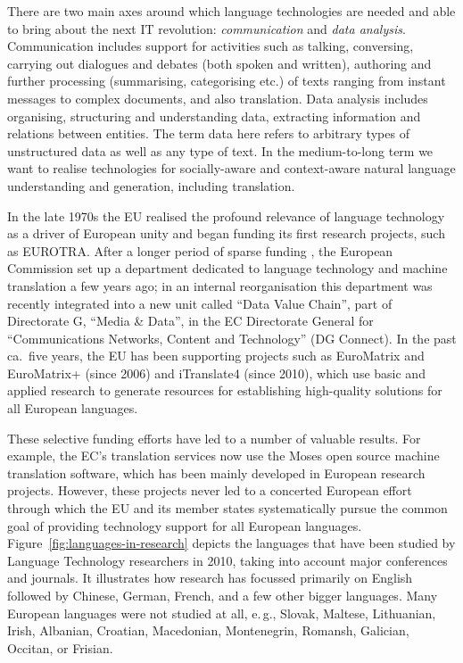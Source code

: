\documentclass[10pt, plain]{../../metanetpaper}
\begin{document}
\begin{multicols}{2}
There are two main axes around which language technologies are needed and able to bring about the next IT revolution: \emph{communication} and \emph{data analysis}. Communication includes support for activities such as talking, conversing, carrying out dialogues and debates (both spoken and written), authoring and further processing (summarising, categorising etc.) of texts ranging from instant messages to complex documents, and also translation. Data analysis includes organising, structuring and understanding data, extracting information and relations between entities. The term data here refers to arbitrary types of unstructured data as well as any type of text. In the medium-to-long term we want to realise technologies for socially-aware and context-aware natural language understanding and generation, including translation.

In the late 1970s the EU realised the profound relevance of language technology as a driver of European unity and began funding its first research projects, such as EUROTRA. After a longer period of sparse funding \cite{laz1,euromap}, the European Commission set up a department dedicated to language technology and machine translation a few years ago; in an internal reorganisation this department was recently integrated into a new unit called ``Data Value Chain'', part of Directorate G, ``Media \& Data'', in the EC Directorate General for ``Communications Networks, Content and Technology'' (DG Connect). In the past ca.~five years, the EU has been supporting projects such as EuroMatrix and EuroMatrix+ (since 2006) and iTranslate4 (since 2010), which use basic and applied research to generate resources for establishing high-quality solutions for all European languages.

These selective funding efforts have led to a number of valuable results. For example, the EC's translation services now use the Moses open source machine translation software, which has been mainly developed in European research projects. However, these projects never led to a concerted European effort through which the EU and its member states systematically pursue the common goal of providing technology support for all European languages. Figure~\ref{fig:languages-in-research} depicts the languages that have been studied by Language Technology researchers in 2010, taking into account major conferences and journals. It illustrates how research has focussed primarily on English followed by Chinese, German, French, and a few other bigger languages. Many European languages were not studied at all, e.\,g., Slovak, Maltese, Lithuanian, Irish, Albanian, Croatian, Macedonian, Montenegrin, Romansh, Galician, Occitan, or Frisian.


\end{multicols}
\end{document}
